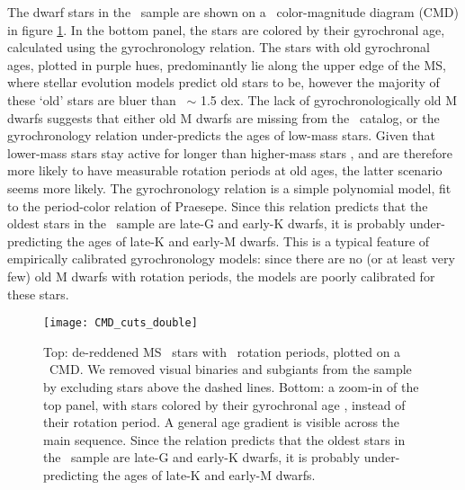The dwarf stars in the \mct\ sample are shown on a \gaia\ color-magnitude
diagram (CMD) in figure \ref{fig:age_gradient}.
In the bottom panel, the stars are colored by their gyrochronal age,
calculated using the \citet{angus2019} gyrochronology relation.
The stars with old gyrochronal ages, plotted in purple hues, predominantly lie
along the upper edge of the MS, where stellar evolution models predict old
stars to be, however the majority of these `old' stars are bluer than \gcolor\
$\sim$ 1.5 dex.
The lack of gyrochronologically old M dwarfs suggests that either old M dwarfs
are missing from the \mct\ catalog, or the \citet{angus2019} gyrochronology
relation under-predicts the ages of low-mass stars.
Given that lower-mass stars stay active for longer than higher-mass stars
\citep[\eg][]{west2011}, and are therefore more likely to have measurable
rotation periods at old ages, the latter scenario seems more likely.
The \citet{angus2019} gyrochronology relation is a simple polynomial model,
fit to the period-color relation of Praesepe.
Since this relation predicts that the oldest stars in the \mct\ sample are
late-G and early-K dwarfs, it is probably under-predicting the ages of late-K
and early-M dwarfs.
This is a typical feature of empirically calibrated gyrochronology models:
since there are no (or at least very few) old M dwarfs with rotation periods,
the models are poorly calibrated for these stars.
\begin{figure}
  \caption{
      Top: de-reddened MS \kepler\ stars with \mct\ rotation periods, plotted
    on a \gaia\ CMD.
    We removed visual binaries and subgiants from the sample by excluding
    stars above the dashed lines.
    Bottom: a zoom-in of the top panel, with stars colored by their
    gyrochronal age \citep{angus2019}, instead of their rotation period.
    A general age gradient is visible across the main sequence.
    Since the \citet{angus2019} relation predicts that the oldest stars in
    the \mct\ sample are late-G and early-K dwarfs, it is probably
    under-predicting the ages of late-K and early-M dwarfs.
}
  \centering
    \texttt{[image: CMD\_cuts\_double]}
\label{fig:age_gradient}
\end{figure}

